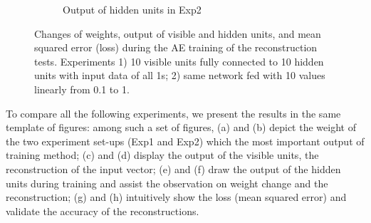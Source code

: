 \begin{figure}
\begin{subfigure}[t]{0.45\textwidth}
		\caption{Output of hidden units in Exp2}
	\end{subfigure}
	\caption{Changes of weights, output of visible and hidden units, and mean squared error (loss) during the AE training of the reconstruction tests. 
		Experiments 1) 10 visible units fully connected to 10 hidden units with input data of all 1s; 2) \DIFaddbeginFL {}\DIFaddendFL same network fed with 10 values \DIFdelbeginFL {}\DIFdelendFL \DIFaddbeginFL {}\DIFaddendFL linearly from 0.1 to 1.}
	\label{fig:ae_orig}
\end{figure}

To compare all the following experiments, we present the results in the same template of figures:
among such a set of figures, (a) and (b) depict the weight \DIFdelbegin {}\DIFdelend \DIFaddbegin {}\DIFaddend of the two experiment set-ups (Exp1 and Exp2) which \DIFdelbegin {}\DIFdelend \DIFaddbegin {}\DIFaddend the most important output of \DIFdelbegin {}\DIFdelend \DIFaddbegin {}\DIFaddend training method;
(c) and (d) display the output of the visible units, the reconstruction of the input vector;
(e) and (f) draw the output of the hidden units during training and assist the observation on weight change and the reconstruction;
(g) and (h) intuitively show the loss (mean squared error) and validate the accuracy of the reconstructions.



